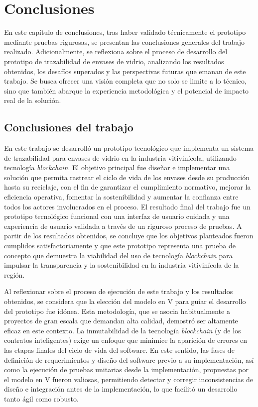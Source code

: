 \chapter[Conclusiones]{Conclusiones}
\label{cp:conclusions}

\parindent0pt

En este capítulo de conclusiones, tras haber validado técnicamente el prototipo mediante pruebas rigurosas, se presentan las conclusiones generales del trabajo realizado. Adicionalmente, se reflexiona sobre el proceso de desarrollo del prototipo de trazabilidad de envases de vidrio, analizando los resultados obtenidos, los desafíos superados y las perspectivas futuras que emanan de este trabajo. Se busca ofrecer una visión completa que no solo se limite a lo técnico, sino que también abarque la experiencia metodológica y el potencial de impacto real de la solución.

\section{Conclusiones del trabajo}

En este trabajo se desarrolló un prototipo tecnológico que implementa un sistema de trazabilidad para envases de vidrio en la industria vitivinícola, utilizando tecnología \textit{blockchain}. El objetivo principal fue diseñar e implementar una solución que permita rastrear el ciclo de vida de los envases desde su producción hasta su reciclaje, con el fin de garantizar el cumplimiento normativo, mejorar la eficiencia operativa, fomentar la sostenibilidad y aumentar la confianza entre todos los actores involucrados en el proceso. El resultado final del trabajo fue un prototipo tecnológico funcional con una interfaz de usuario cuidada y una experiencia de usuario validada a través de un riguroso proceso de pruebas. A partir de los resultados obtenidos, se concluye que los objetivos planteados fueron cumplidos satisfactoriamente y que este prototipo representa una prueba de concepto que demuestra la viabilidad del uso de tecnología \textit{blockchain} para impulsar la transparencia y la sostenibilidad en la industria vitivinícola de la región.

Al reflexionar sobre el proceso de ejecución de este trabajo y los resultados obtenidos, se considera que la elección del modelo en V para guiar el desarrollo del prototipo fue idónea. Esta metodología, que se asocia habitualmente a proyectos de gran escala que demandan alta calidad, demostró ser altamente eficaz en este contexto. La inmutabilidad de la tecnología \textit{blockchain} (y de los contratos inteligentes) exige un enfoque que minimice la aparición de errores en las etapas finales del ciclo de vida del software. En este sentido, las fases de definición de requerimientos y diseño del software previo a su implementación, así como la ejecución de pruebas unitarias desde la implementación, propuestas por el modelo en V fueron valiosas, permitiendo detectar y corregir inconsistencias de diseño e integración antes de la implementación, lo que facilitó un desarrollo tanto ágil como robusto.

